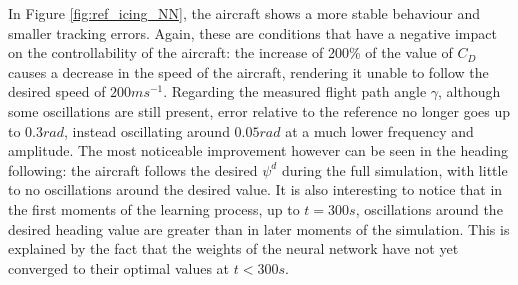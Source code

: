 In Figure \ref{fig:ref_icing_NN}, the aircraft shows a more stable behaviour and smaller tracking errors. Again, these are conditions that have a negative impact on the controllability of the aircraft: the increase of 200\% of the value of $C_D$ causes a decrease in the speed of the aircraft, rendering it unable to follow the desired speed of $200ms^{-1}$. Regarding the measured flight path angle $\gamma$, although  some oscillations are still present, error relative to the reference no longer goes up to $0.3 rad$, instead oscillating around $0.05rad$ at a much lower frequency and amplitude. The most noticeable improvement however can be seen in the heading following: the aircraft follows the desired $\psi^d$ during the full simulation, with little to no oscillations around the desired value. It is also interesting to notice that in the first moments of the learning process, up to $t=300s$, oscillations around the desired heading value are greater than in later moments of the simulation. This is explained by the fact that the weights of the neural network have not yet converged to their optimal values at $t<300s$.
